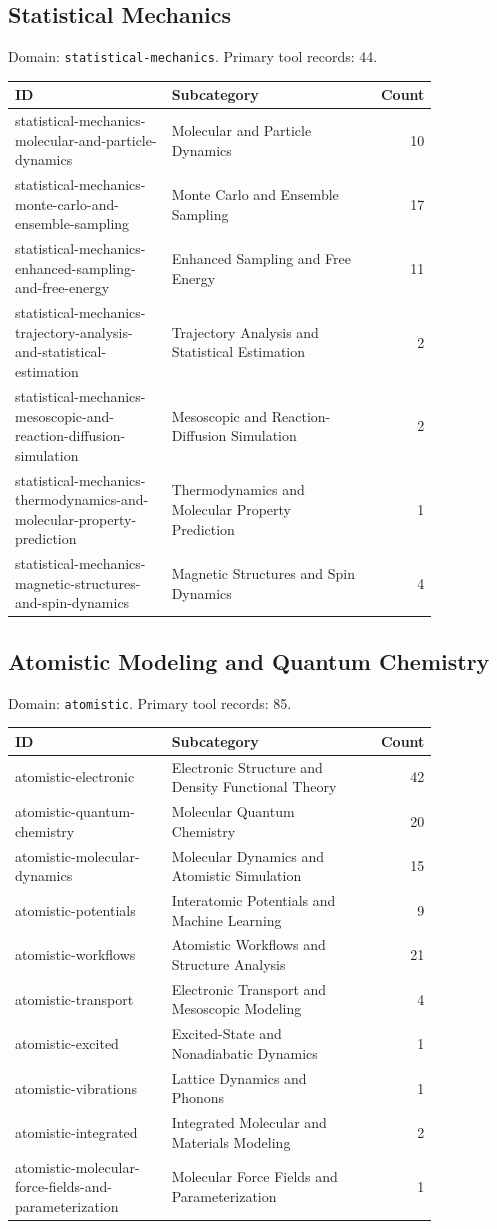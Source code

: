\subsection{Statistical Mechanics}
\noindent Domain: \texttt{statistical-mechanics}. Primary tool records: 44.
\begin{longtable}{p{0.37\linewidth}p{0.47\linewidth}r}
ID & Subcategory & Count\\\hline\endhead
statistical-mechanics-molecular-and-particle-dynamics & Molecular and Particle Dynamics & 10\\
statistical-mechanics-monte-carlo-and-ensemble-sampling & Monte Carlo and Ensemble Sampling & 17\\
statistical-mechanics-enhanced-sampling-and-free-energy & Enhanced Sampling and Free Energy & 11\\
statistical-mechanics-trajectory-analysis-and-statistical-estimation & Trajectory Analysis and Statistical Estimation & 2\\
statistical-mechanics-mesoscopic-and-reaction-diffusion-simulation & Mesoscopic and Reaction-Diffusion Simulation & 2\\
statistical-mechanics-thermodynamics-and-molecular-property-prediction & Thermodynamics and Molecular Property Prediction & 1\\
statistical-mechanics-magnetic-structures-and-spin-dynamics & Magnetic Structures and Spin Dynamics & 4\\
\end{longtable}
\subsection{Atomistic Modeling and Quantum Chemistry}
\noindent Domain: \texttt{atomistic}. Primary tool records: 85.
\begin{longtable}{p{0.37\linewidth}p{0.47\linewidth}r}
ID & Subcategory & Count\\\hline\endhead
atomistic-electronic & Electronic Structure and Density Functional Theory & 42\\
atomistic-quantum-chemistry & Molecular Quantum Chemistry & 20\\
atomistic-molecular-dynamics & Molecular Dynamics and Atomistic Simulation & 15\\
atomistic-potentials & Interatomic Potentials and Machine Learning & 9\\
atomistic-workflows & Atomistic Workflows and Structure Analysis & 21\\
atomistic-transport & Electronic Transport and Mesoscopic Modeling & 4\\
atomistic-excited & Excited-State and Nonadiabatic Dynamics & 1\\
atomistic-vibrations & Lattice Dynamics and Phonons & 1\\
atomistic-integrated & Integrated Molecular and Materials Modeling & 2\\
atomistic-molecular-force-fields-and-parameterization & Molecular Force Fields and Parameterization & 1\\
\end{longtable}
